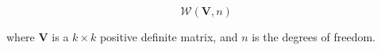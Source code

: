 \begin{equation}
    \mathcal{W} \left( \mathbf{V}, n \right)
    \label{eq:wishart}
\end{equation}

\noindent where
$\mathbf{V}$ is a $k \times k$ positive definite matrix,
and
$n$ is the degrees of freedom.
